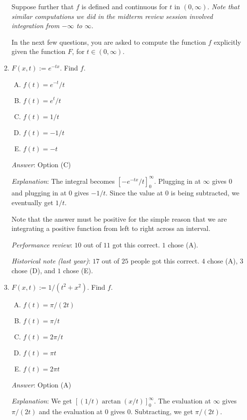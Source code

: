 \documentclass[10pt]{amsart}
\begin{document}
\begin{enumerate}
  Suppose further that $f$ is defined and continuous for $t$ in
  $(0,\infty)$. {\em Note that similar computations we did in the
    midterm review session involved integration from $-\infty$ to
    $\infty$}.

  In the next few questions, you are asked to compute the function $f$
  explicitly given the function $F$, for $t \in (0,\infty)$.

\item $F(x,t) := e^{-tx}$. Find $f$.

  \begin{enumerate}[(A)]
  \item $f(t) = e^{-t}/t$
  \item $f(t) = e^t/t$
  \item $f(t) = 1/t$
  \item $f(t) = -1/t$
  \item $f(t) = -t$
  \end{enumerate}

  {\em Answer}: Option (C)

  {\em Explanation}: The integral becomes
  $[-e^{-tx}/t]_0^\infty$. Plugging in at $\infty$ gives $0$ and
  plugging in at $0$ gives $-1/t$. Since the value at $0$ is being
  subtracted, we eventually get $1/t$.

  Note that the answer must be positive for the simple reason that we
  are integrating a positive function from left to right across an
  interval.

  {\em Performance review}: $10$ out of $11$ got this correct. $1$
  chose (A).

  {\em Historical note (last year)}: $17$ out of $25$ people got this
  correct. $4$ chose (A), $3$ chose (D), and $1$ chose (E).

\item $F(x,t) := 1/(t^2 + x^2)$. Find $f$.

  \begin{enumerate}[(A)]
  \item $f(t) = \pi/(2t)$
  \item $f(t) = \pi/t$
  \item $f(t) = 2\pi/t$
  \item $f(t) = \pi t$
  \item $f(t) = 2\pi t$
  \end{enumerate}

  {\em Answer}: Option (A)

  {\em Explanation}: We get $[(1/t)\arctan(x/t)]_0^\infty$. The
  evaluation at $\infty$ gives $\pi/(2t)$ and the evaluation at $0$
  gives $0$. Subtracting, we get $\pi/(2t)$.


\end{enumerate}
\end{document}
